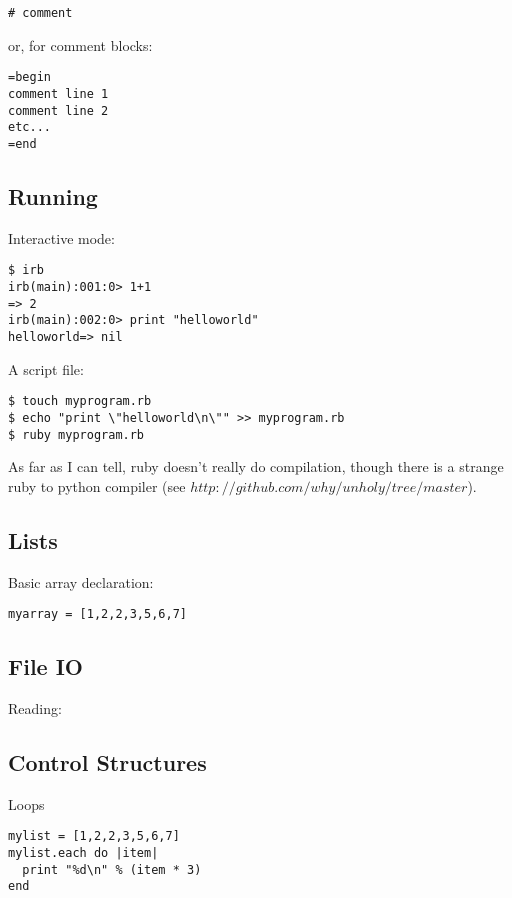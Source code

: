 \documentclass[10pt,twoside,a4paper]{article}
\begin{document}
\begin{verbatim}
# comment
\end{verbatim}

or, for comment blocks:

\begin{verbatim}
=begin
comment line 1
comment line 2
etc...
=end
\end{verbatim}



\subsection{Running}

Interactive mode:

\begin{verbatim}
$ irb
irb(main):001:0> 1+1
=> 2
irb(main):002:0> print "helloworld"
helloworld=> nil
\end{verbatim}

A script file:

\begin{verbatim}
$ touch myprogram.rb
$ echo "print \"helloworld\n\"" >> myprogram.rb
$ ruby myprogram.rb
\end{verbatim}

As far as I can tell, ruby doesn't really do compilation, though there is a strange ruby to python compiler (see $http://github.com/why/unholy/tree/master$).



\subsection{Lists}

Basic array declaration:

\begin{verbatim}
myarray = [1,2,2,3,5,6,7]
\end{verbatim}


\subsection{File IO}

Reading:

\subsection{Control Structures}

Loops

\begin{verbatim}
mylist = [1,2,2,3,5,6,7]
mylist.each do |item|
  print "%d\n" % (item * 3)
end


\end{verbatim}
\end{document}
